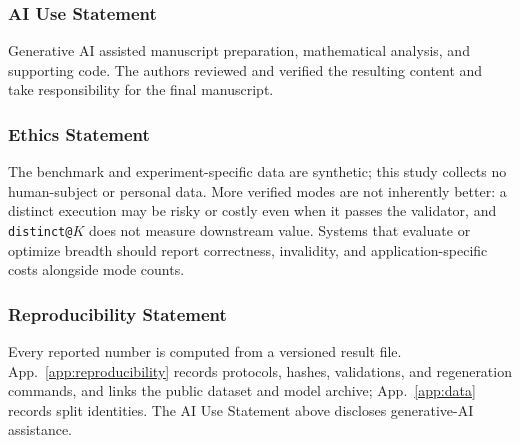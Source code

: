\documentclass{article}
\newcommand{\1}{\mathbf 1}
\theoremstyle{remark}
\theoremstyle{definition}
\theoremstyle{plain}
\begin{document}
\label{sec:main-end}

\clearpage
\subsubsection*{AI Use Statement}
\label{sec:ai-use}

Generative AI assisted manuscript preparation, mathematical analysis, and
supporting code. The authors reviewed and verified the resulting content and
take responsibility for the final manuscript.

\subsubsection*{Ethics Statement}

The benchmark and experiment-specific data are synthetic; this study collects
no human-subject or personal data. More verified modes are not inherently
better: a distinct execution may be risky or costly even when it passes the
validator, and \texttt{distinct@}$K$ does not measure downstream value. Systems
that evaluate or optimize breadth should report correctness, invalidity, and
application-specific costs alongside mode counts.

\subsubsection*{Reproducibility Statement}

Every reported number is computed from a versioned result file.
App.~\ref{app:reproducibility} records protocols, hashes, validations,
and regeneration commands, and links the public dataset and model archive;
App.~\ref{app:data} records split identities.
The AI Use Statement above discloses generative-AI assistance.

\clearpage
{}\label{sec:references}


\end{document}
